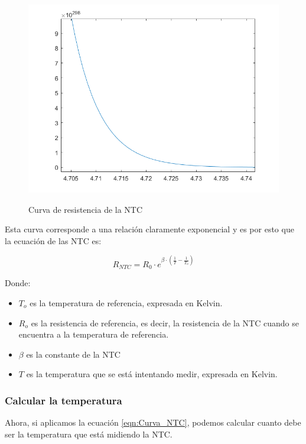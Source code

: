 \documentclass[12pt]{article}
\begin{document}
\begin{figure}[H]
\centering
\includegraphics[scale=1]{src/imagenes/Curva_NTC.png}
\label{fgr:Curva_NTC}
\caption{Curva de resistencia de la NTC}
\end{figure}

Esta curva corresponde a una relación claramente exponencial y es por esto que la ecuación de las NTC es:

\begin{equation}
	\label{eqn:Curva_NTC}
	R_{NTC} = R_{0} \cdot e^{\beta \cdot (\frac{1}{T} - \frac{1}{T_{o}})}
\end{equation}

Donde:

\begin{itemize}
	\item $T_{o}$ es la temperatura de referencia, expresada en Kelvin.
	\item $R_{o}$ es la resistencia de referencia, es decir, la resistencia de la NTC cuando se encuentra a la temperatura de referencia.
	\item $\beta$ es la constante de la NTC
	\item $T$ es la temperatura que se está intentando medir, expresada en Kelvin.
\end{itemize}

\subsubsection{Calcular la temperatura}

Ahora, si aplicamos la ecuación \eqref{eqn:Curva_NTC}, podemos calcular cuanto debe ser la temperatura que está midiendo la NTC.
\end{document}
